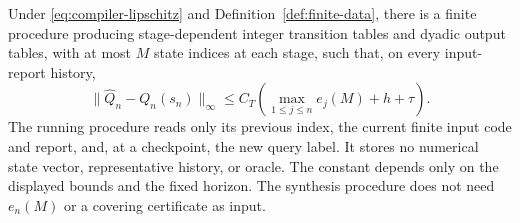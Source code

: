 \begin{theorem}
\label{thm:compact-compiler}
Under \eqref{eq:compiler-lipschitz} and Definition~\ref{def:finite-data},
there is a finite procedure producing stage-dependent integer transition
tables and dyadic output tables, with at most $M$ state indices at each
stage, such that, on every input-report history,
\begin{equation}\label{eq:compiler-bound}
 \|\widehat Q_n-Q_n(s_n)\|_\infty
 \le C_T\left(\max_{1\le j\le n}e_j(M)+h+\tau\right).
\end{equation}
The running procedure reads only its previous index, the current finite
input code and report, and, at a checkpoint, the new query label. It
stores no numerical state vector, representative history, or oracle.
The constant depends only on the displayed bounds and the fixed horizon.
The synthesis procedure does not need $e_n(M)$ or a covering certificate
as input.
\end{theorem}
